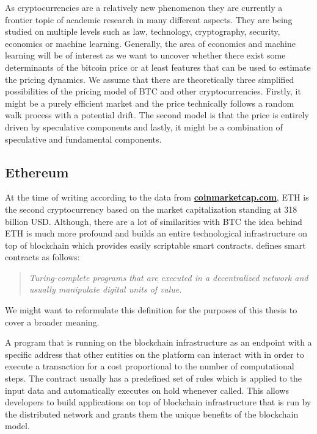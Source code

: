 As cryptocurrencies are a relatively new phenomenon they are currently a frontier topic of academic 
research in many different aspects. They are being studied on multiple levels such as
law, technology, cryptography, security, economics or machine learning. Generally, the area
of economics and machine learning will be of interest as we want to uncover
whether there exist some determinants of the bitcoin price or at least features that can be used 
to estimate the pricing dynamics. We assume that there are theoretically three simplified 
possibilities of the pricing model 
of \ac{BTC} and other cryptocurrencies. Firstly, it might be a purely efficient market 
and the price technically follows a random walk process with a potential drift. 
The second model is that the price is entirely
driven by speculative components and lastly, it might be a combination of speculative and fundamental
components.


\subsection{Ethereum}
At the time of writing according to the data from 
\textbf{\href{https://coinmarketcap.com/}{coinmarketcap.com}}, 
\newline
\ac{ETH} 
is the second cryptocurrency 
based on the market capitalization standing at 318 billion USD. Although, there are a lot of 
similarities with \ac{BTC} the idea behind \ac{ETH} is much more profound and builds an entire
technological infrastructure on top of blockchain which provides easily
scriptable smart contracts. \cite{Tikhomirov2018} defines smart contracts as follows:

\begin{quote}
    \textit{Turing-complete programs that are executed in a 
    decentralized network and usually manipulate digital units of value.}
\end{quote}

We might want to reformulate this definition for the purposes
of this thesis to cover a broader meaning.

\begin{defin}\label{de:contract}
    A program that is running on the blockchain infrastructure as an endpoint
    with a specific address that other entities on the platform can interact
    with in order to execute a transaction for a cost proportional to the
    number of computational steps. The contract 
    usually has a predefined set of rules which is applied to the input data
    and automatically executes on hold whenever called. This allows developers
    to build applications on top of blockchain infrastructure that is run 
    by the distributed network and grants them the unique benefits
    of the blockchain model.
\end{defin}


